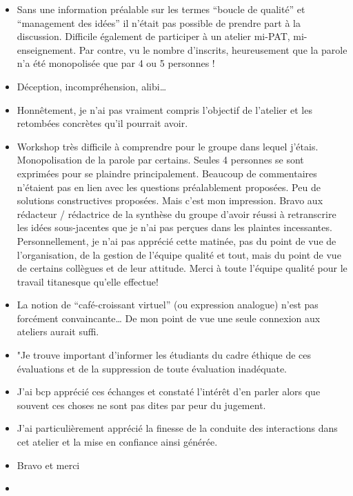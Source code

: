 \documentclass[
  french,
]{article}
\begin{document}
\begin{itemize}
\item
  Sans une information préalable sur les termes ``boucle de qualité'' et ``management des idées'' il n'était pas possible de prendre part à la discussion. Difficile également de participer à un atelier mi-PAT, mi-enseignement. Par contre, vu le nombre d'inscrits, heureusement que la parole n'a été monopolisée que par 4 ou 5 personnes !
\item
  Déception, incompréhension, alibi\ldots{}
\item
  Honnêtement, je n'ai pas vraiment compris l'objectif de l'atelier et les retombées concrètes qu'il pourrait avoir.
\item
  Workshop très difficile à comprendre pour le groupe dans lequel j'étais. Monopolisation de la parole par certains. Seules 4 personnes se sont exprimées pour se plaindre principalement. Beaucoup de commentaires n'étaient pas en lien avec les questions préalablement proposées. Peu de solutions constructives proposées. Mais c'est mon impression. Bravo aux rédacteur / rédactrice de la synthèse du groupe d'avoir réussi à retranscrire les idées sous-jacentes que je n'ai pas perçues dans les plaintes incessantes. Personnellement, je n'ai pas apprécié cette matinée, pas du point de vue de l'organisation, de la gestion de l'équipe qualité et tout, mais du point de vue de certains collègues et de leur attitude. Merci à toute l'équipe qualité pour le travail titanesque qu'elle effectue!
\item
  La notion de ``café-croissant virtuel'' (ou expression analogue) n'est pas forcément convaincante\ldots{} De mon point de vue une seule connexion aux ateliers aurait suffi.
\item
  "Je trouve important d'informer les étudiants du cadre éthique de ces évaluations et de la suppression de toute évaluation inadéquate.
\item
  J'ai bcp apprécié ces échanges et constaté l'intérêt d'en parler alors que souvent ces choses ne sont pas dites par peur du jugement.
\item
  J'ai particulièrement apprécié la finesse de la conduite des interactions dans cet atelier et la mise en confiance ainsi générée.
\item
  Bravo et merci
\item

\end{itemize}
\end{document}
